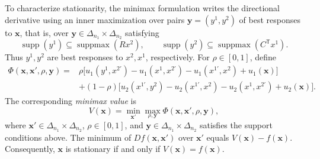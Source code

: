 \documentclass[11pt]{article}
\theoremstyle{remark}
\theoremstyle{plain}
\DeclareMathOperator{\supp}{supp}
\DeclareMathOperator{\suppmax}{suppmax}
\begin{document}
To characterize stationarity, the minimax formulation writes the
directional derivative using an inner maximization over pairs
$\boldsymbol{y}=(y^1,y^2)$ of best responses to $\boldsymbol x$,
that is, over $\boldsymbol{y}\in\Delta_{n_1}\times\Delta_{n_2}$
satisfying
\[
 \supp(y^1)\subseteq\suppmax(Rx^2),
 \qquad
 \supp(y^2)\subseteq\suppmax(C^{\mathsf T}x^1).
\]
Thus $y^1,y^2$ are best responses to $x^2,x^1$, respectively.
For $\rho\in[0,1]$, define
\begin{equation}
\begin{aligned}
 \Phi(\boldsymbol{x},\boldsymbol{x}',\rho,\boldsymbol{y})={}&
 \rho\bigl[u_1(y^1,x^{2\prime})-u_1(x^1,x^{2\prime})
       -u_1(x^{1\prime},x^2)+u_1(\boldsymbol{x})\bigr]\\
 &+(1-\rho)\bigl[u_2(x^{1\prime},y^2)-u_2(x^{1\prime},x^2)
       -u_2(x^1,x^{2\prime})+u_2(\boldsymbol{x})\bigr].
\end{aligned}
 \label{eq:stationary-T}
\end{equation}
The corresponding \emph{minimax value} is
\[
 V(\boldsymbol{x})
   =\min_{\boldsymbol{x}'}\max_{\rho,\boldsymbol{y}}
       \Phi(\boldsymbol{x},\boldsymbol{x}',\rho,\boldsymbol{y}),
\]
where $\boldsymbol{x}'\in\Delta_{n_1}\times\Delta_{n_2}$,
$\rho\in[0,1]$, and
$\boldsymbol{y}\in\Delta_{n_1}\times\Delta_{n_2}$ satisfies the
support conditions above.
The minimum of $Df(\boldsymbol{x},\boldsymbol{x}')$ over
$\boldsymbol{x}'$ equals $V(\boldsymbol{x})-f(\boldsymbol{x})$.
Consequently, $\boldsymbol{x}$ is stationary if and only if
$V(\boldsymbol{x})=f(\boldsymbol{x})$.
\end{document}

